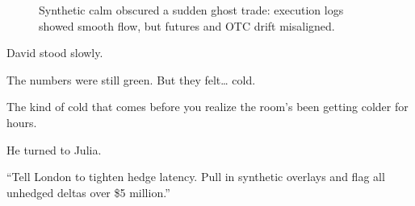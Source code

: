 \begin{figure}[H]
  \centering
  \caption{Synthetic calm obscured a sudden ghost trade: execution logs showed smooth flow, but futures and OTC drift misaligned.}
\end{figure}

\medskip

David stood slowly.

The numbers were still green.
But they felt… cold.

The kind of cold that comes before you realize the room’s been getting colder for hours.

He turned to Julia.

“Tell London to tighten hedge latency. Pull in synthetic overlays and flag all unhedged deltas over \$5 million.”

\medskip

